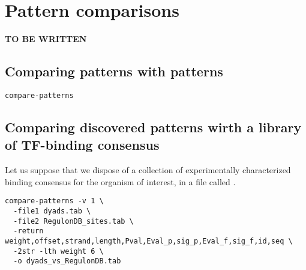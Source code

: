 \chapter{Pattern comparisons}

\textbf{TO BE WRITTEN}

\section{Comparing patterns with patterns}

\begin{small}
\begin{verbatim}
compare-patterns

\end{verbatim}
\end{small}

\section{Comparing discovered patterns wirth a library of TF-binding consensus}

Let us suppose that we dispose of a collection of experimentally
characterized binding consensus for the organism of interest, in a
file called . 

\begin{small}
\begin{verbatim}
compare-patterns -v 1 \
  -file1 dyads.tab \
  -file2 RegulonDB_sites.tab \
  -return weight,offset,strand,length,Pval,Eval_p,sig_p,Eval_f,sig_f,id,seq \
  -2str -lth weight 6 \
  -o dyads_vs_RegulonDB.tab
\end{verbatim}
\end{small}
